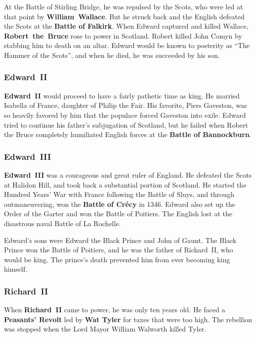 At the Battle of Stirling Bridge, he was repulsed by the Scots,
who were led at that point by \textbf{William~Wallace}.
But he struck back and the English defeated the Scots at the \textbf{Battle of Falkirk}.
When Edward captured and killed Wallace, \textbf{Robert~the~Bruce} rose to power in Scotland.
Robert killed John Comyn by stabbing him to death on an altar.
Edward would be known to posterity as ``The Hammer of the Scots'',
and when he died, he was succeeded by his son.

\subsubsection*{Edward~II}

\textbf{Edward~II} would proceed to have a fairly pathetic time as king.
He married Isabella of France, daughter of Philip the Fair.
His favorite, Piers Gaveston, was so heavily favored by him that the populace forced Gaveston into exile.
Edward tried to continue his father's subjugation of Scotland,
but he failed when Robert the Bruce completely humiliated English forces at the \textbf{Battle of Bannockburn}.

\subsubsection*{Edward~III}

\textbf{Edward~III} was a courageous and great ruler of England.
He defeated the Scots at Halidon Hill, and took back a substantial portion of Scotland.
He started the Hundred Years' War with France following the Battle of Sluys,
and through outmaneuvering, won the \textbf{Battle of Cr\'ecy} in 1346.
Edward also set up the Order of the Garter and won the Battle of Poitiers.
The English lost at the disastrous naval Battle of La Rochelle.

Edward's sons were Edward the Black Prince and John of Gaunt.
The Black Prince won the Battle of Poitiers, and he was the father of Richard~II, who would be king.
The prince's death prevented him from ever becoming king himself.

\subsubsection*{Richard~II}

When \textbf{Richard~II} came to power, he was only ten years old.
He faced a \textbf{Peasants' Revolt} led by \textbf{Wat Tyler} for taxes that were too high.
The rebellion was stopped when the Lord Mayor William Walworth killed Tyler.

